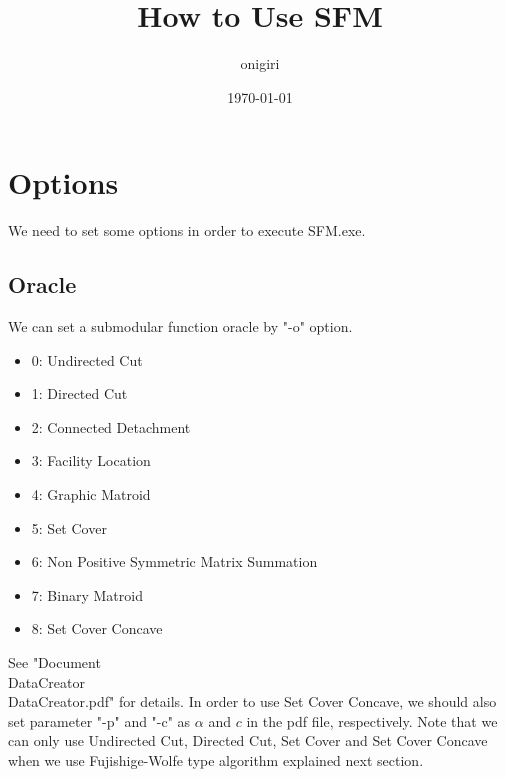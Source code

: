 \documentclass{article}
\begin{document}
\fontsize{10pt}{12pt}\selectfont
%

\title{How to Use SFM }
\author{onigiri}
\date{\today}


\maketitle
\newpage


\tableofcontents

\newpage

\section{Options}
We need to set some options in order to execute SFM.exe.

\subsection{Oracle}
We can set a submodular function oracle by "-o" option.
\begin{itemize}
\item 0: Undirected Cut
\item 1: Directed Cut
\item 2: Connected Detachment
\item 3: Facility Location
\item 4: Graphic Matroid
\item 5: Set Cover
\item 6: Non Positive Symmetric Matrix Summation
\item 7: Binary Matroid
\item 8: Set Cover Concave
\end{itemize}

See "Document\\DataCreator\\DataCreator.pdf" for details.
In order to use Set Cover Concave,
we should also set parameter "-p" and "-c" as $\alpha$ and $c$ in the pdf file, respectively.
Note that we can only use Undirected Cut, Directed Cut, Set Cover and Set Cover Concave
when we use Fujishige-Wolfe type algorithm explained next section.
\end{document}
